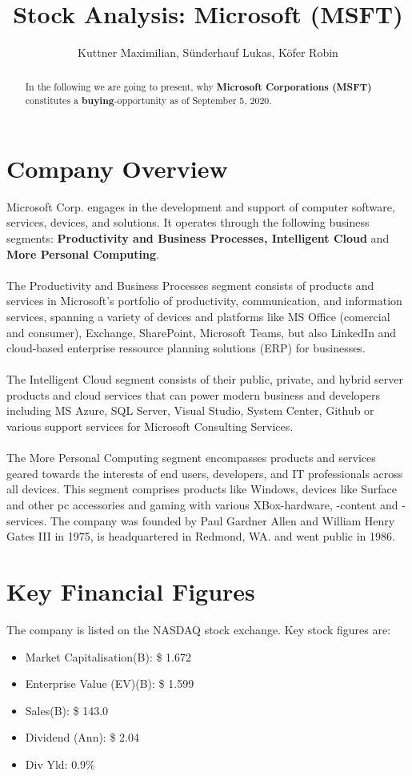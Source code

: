 \documentclass[]{article}
\title{Stock Analysis: Microsoft (MSFT)}
\author{Kuttner Maximilian, Sünderhauf Lukas, Köfer Robin}
\begin{document}
\maketitle



\begin{abstract}
\noindent In the following we are going to present, why \textbf{Microsoft Corporations (MSFT)} constitutes a \textbf{buying}-opportunity as of September 5, 2020.
\end{abstract}

\section{Company Overview}
Microsoft Corp. engages in the development and support of computer software, services, devices, and solutions. It operates through the following business segments: \textbf{Productivity and Business Processes, Intelligent Cloud} and \textbf{More Personal Computing}.\\\\
The Productivity and Business Processes segment consists of products and services in Microsoft's portfolio of productivity, communication, and information services, spanning a variety of devices and platforms like MS Office (comercial and consumer), Exchange, SharePoint, Microsoft Teams, but also LinkedIn and cloud-based enterprise ressource planning solutions (ERP) for businesses.\\\\
The Intelligent Cloud segment consists of their public, private, and hybrid server products and cloud services that can power modern business and developers including MS Azure, SQL Server, Visual Studio, System Center, Github or various support services for Microsoft Consulting Services.\\\\
The More Personal Computing segment encompasses products and services geared towards the interests of end users, developers, and IT professionals across all devices. This segment comprises products like Windows, devices like Surface and other pc accessories and gaming with various XBox-hardware, -content and -services.
The company was founded by Paul Gardner Allen and William Henry Gates III in 1975, is headquartered in Redmond, WA. and went public in 1986.\cite{wiki:xxx}
\clearpage
\section{Key Financial Figures}
The company is listed on the NASDAQ stock exchange. Key stock figures are:
\begin{itemize}
	\item Market Capitalisation(B): \$ 1.672
	\item Enterprise Value (EV)(B): \$ 1.599
	\item Sales(B): \$ 143.0
	\item Dividend (Ann): \$ 2.04
	\item Div Yld: 0.9\%
\end{itemize}
\end{document}
